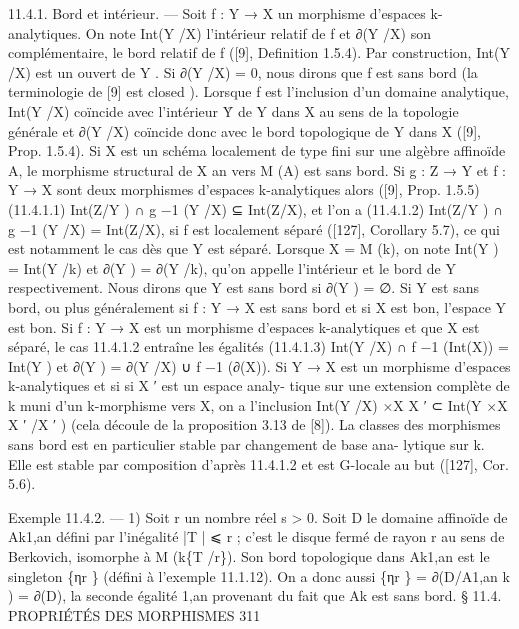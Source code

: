 \documentclass[
  10pt,
]{article}
\newenvironment{Shaded}{}{}
\newcommand{\NormalTok}[1]{#1}
\begin{document}
\begin{Shaded}
\begin{Highlighting}[]
\NormalTok{11.4.1. Bord et intérieur. — Soit f : Y → X un morphisme d’espaces k{-}analytiques.}
\NormalTok{On note Int(Y /X) l’intérieur relatif de f et ∂(Y /X) son complémentaire, le bord relatif}
\NormalTok{de f ([9], Definition 1.5.4). Par construction, Int(Y /X) est un ouvert de Y . Si ∂(Y /X) =}
\NormalTok{0, nous dirons que f est sans bord (la terminologie de [9] est closed ). Lorsque f est}
\NormalTok{l’inclusion d’un domaine analytique, Int(Y /X) coïncide avec l’intérieur Y̊ de Y dans X}
\NormalTok{au sens de la topologie générale et ∂(Y /X) coïncide donc avec le bord topologique de Y}
\NormalTok{dans X ([9], Prop. 1.5.4).}
\NormalTok{   Si X est un schéma localement de type fini sur une algèbre affinoïde A, le morphisme}
\NormalTok{structural de X an vers M (A) est sans bord.}
\NormalTok{   Si g : Z → Y et f : Y → X sont deux morphismes d’espaces k{-}analytiques alors ([9],}
\NormalTok{Prop. 1.5.5)}
\NormalTok{(11.4.1.1)                  Int(Z/Y ) ∩ g −1 (Y /X) ⊆ Int(Z/X),}
\NormalTok{et l’on a}
\NormalTok{(11.4.1.2)                  Int(Z/Y ) ∩ g −1 (Y /X) = Int(Z/X),}
\NormalTok{si f est localement séparé ([127], Corollary 5.7), ce qui est notamment le cas dès que Y}
\NormalTok{est séparé.}
\NormalTok{   Lorsque X = M (k), on note Int(Y ) = Int(Y /k) et ∂(Y ) = ∂(Y /k), qu’on appelle}
\NormalTok{l’intérieur et le bord de Y respectivement. Nous dirons que Y est sans bord si ∂(Y ) = ∅.}
\NormalTok{Si Y est sans bord, ou plus généralement si f : Y → X est sans bord et si X est bon,}
\NormalTok{l’espace Y est bon. Si f : Y → X est un morphisme d’espaces k{-}analytiques et que X}
\NormalTok{est séparé, le cas 11.4.1.2 entraîne les égalités}
\NormalTok{(11.4.1.3)    Int(Y /X) ∩ f −1 (Int(X)) = Int(Y ) et ∂(Y ) = ∂(Y /X) ∪ f −1 (∂(X)).}
\NormalTok{   Si Y → X est un morphisme d’espaces k{-}analytiques et si si X ′ est un espace analy{-}}
\NormalTok{tique sur une extension complète de k muni d’un k{-}morphisme vers X, on a l’inclusion}
\NormalTok{Int(Y /X) ×X X ′ ⊂ Int(Y ×X X ′ /X ′ ) (cela découle de la proposition 3.13 de [8]). La}
\NormalTok{classes des morphismes sans bord est en particulier stable par changement de base ana{-}}
\NormalTok{lytique sur k. Elle est stable par composition d’après 11.4.1.2 et est G{-}locale au but}
\NormalTok{([127], Cor. 5.6).}

\NormalTok{Exemple 11.4.2. — 1) Soit r un nombre réel s \textgreater{} 0. Soit D le domaine affinoïde de}
\NormalTok{Ak1,an défini par l’inégalité |T | ⩽ r ; c’est le disque fermé de rayon r au sens de Berkovich,}
\NormalTok{isomorphe à M (k\{T /r\}). Son bord topologique dans Ak1,an est le singleton \{ηr \} (défini}
\NormalTok{à l’exemple 11.1.12). On a donc aussi \{ηr \} = ∂(D/A1,an       k ) = ∂(D), la seconde égalité}
\NormalTok{                            1,an}
\NormalTok{provenant du fait que Ak est sans bord.}
\NormalTok{                                § 11.4. PROPRIÉTÉS DES MORPHISMES                                      311}


\end{Highlighting}
\end{Shaded}
\end{document}
